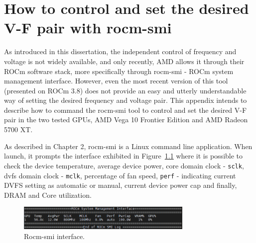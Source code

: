 
\chapter{How to control and set the desired V-F pair with rocm-smi}
\label{chapter:appendixRocm-smi}

As introduced in this dissertation, the independent control of frequency and voltage is not widely available, and only recently, AMD allows it through their ROCm software stack, more specifically through rocm-smi - ROCm system management interface. However, even the most recent version of this tool (presented on ROCm 3.8) does not provide an easy and utterly understandable way of setting the desired frequency and voltage pair. This appendix intends to describe how to command the rocm-smi tool to control and set the desired V-F pair in the two tested GPUs, AMD Vega 10 Frontier Edition and AMD Radeon 5700 XT.

As described in Chapter 2, rocm-smi is a Linux command line application. When launch, it prompts the interface exhibited in Figure~\ref{fig:rocm-smi} where it is possible to check the device temperature, average device power, core domain clock - \texttt{sclk}, \acrshort{dvfs} domain clock - \texttt{mclk}, percentage of fan speed, \texttt{perf} - indicating current DVFS setting as automatic or manual, current device power cap and finally, DRAM and Core utilization.

\begin{figure}[htb]
    \centering
\includegraphics[width=0.75\textwidth]{Figures/AnnexA/rocm-smi.png}
        \caption{Rocm-smi interface.}
    \label{fig:rocm-smi}
\end{figure}


